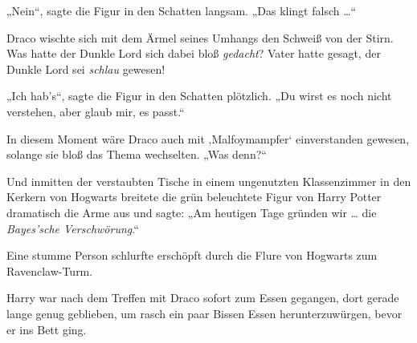 „Nein“, sagte die Figur in den Schatten langsam.
„Das klingt falsch …“

Draco wischte sich mit dem Ärmel seines Umhangs den Schweiß von der Stirn. Was hatte der Dunkle Lord sich dabei bloß \emph{gedacht}? Vater hatte gesagt, der Dunkle Lord sei \emph{schlau} gewesen!

„Ich hab’s“, sagte die Figur in den Schatten plötzlich.
„Du wirst es noch nicht verstehen, aber glaub mir, es passt.“

In diesem Moment wäre Draco auch mit ‚Malfoymampfer‘ einverstanden gewesen, solange sie bloß das Thema wechselten.
„Was denn?“

Und inmitten der verstaubten Tische in einem ungenutzten Klassenzimmer in den Kerkern von Hogwarts breitete die grün beleuchtete Figur von Harry Potter dramatisch die Arme aus und sagte:
„Am heutigen Tage gründen wir … die \emph{Bayes’sche Verschwörung}.“

\later

Eine stumme Person schlurfte erschöpft durch die Flure von Hogwarts zum Ravenclaw-Turm.

Harry war nach dem Treffen mit Draco sofort zum Essen gegangen, dort gerade lange genug geblieben, um rasch ein paar Bissen Essen herunterzuwürgen, bevor er ins Bett ging.

